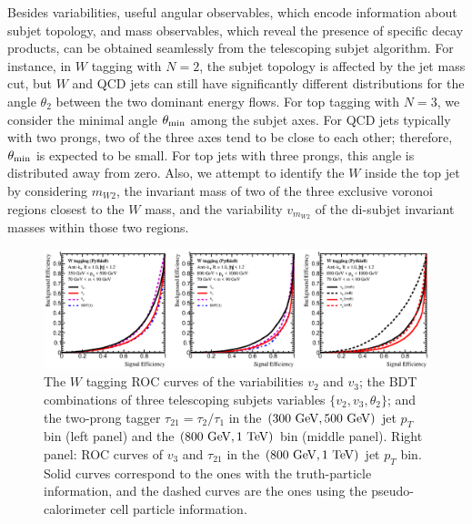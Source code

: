 \documentclass[aps,prl,floatfix,preprintnumbers,twocolumn,groupedaddress,nofootinbib]{revtex4-1}
\begin{document}
Besides variabilities, useful angular observables, which encode information about subjet topology, and mass observables, which reveal the presence of specific decay products, can be obtained seamlessly from the telescoping subjet algorithm. For instance, in $W$ tagging with $N=2$, the subjet topology is affected by the jet mass cut, but $W$ and QCD jets can still have significantly different distributions for the angle $\theta_2$ between the two dominant energy flows. For top tagging with $N=3$, we consider the minimal angle $\theta_{\rm min}$ among the subjet axes. For QCD jets typically with two prongs, two of the three axes tend to be close to each other; therefore, $\theta_{\rm min}$ is expected to be small. For top jets with three prongs, this angle is distributed away from zero. Also, we attempt to identify the $W$ inside the top jet \cite{Thaler:2008ju,Kaplan:2008ie} by considering \textbf{$m_{W2}$}, the invariant mass of two of the three exclusive voronoi regions closest to the $W$ mass, and the variability $v_{m_{W2}}$ of the di-subjet invariant masses within those two regions.

\begin{figure}
    \includegraphics[width=2\columnwidth]{plots/W_ROCs_6.eps}
    \caption{The $W$ tagging ROC curves of the variabilities $v_2$ and $v_3$;
    the BDT combinations of three telescoping subjets variables $\{v_2, v_3, \theta_2\}$; and the two-prong tagger $\tau_{21}=\tau_{2}/\tau_{1}$ in the $(300~{\rm GeV}, 500~{\rm GeV})$ jet $p_T$ bin (left panel) and the $(800~{\rm GeV}, 1~{\rm TeV})$ bin (middle panel). Right panel: ROC curves of $v_3$ and $\tau_{21}$ in the $(800~{\rm GeV}, 1~{\rm TeV})$ jet $p_T$ bin. Solid curves correspond to the ones with the truth-particle information, and the dashed curves are the ones using the pseudo-calorimeter cell particle information.}
\label{ROC_W}
\end{figure}
\end{document}
